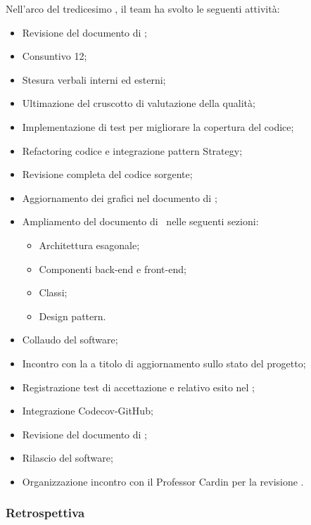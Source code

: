 Nell'arco del tredicesimo , il team ha svolto le seguenti attività:
\begin{itemize}
  \item Revisione del documento di \AdR;
  \item Consuntivo  12;
  \item Stesura verbali interni ed esterni;
  \item Ultimazione del cruscotto di valutazione della qualità;
  \item Implementazione di test  per migliorare la copertura del codice;
  \item Refactoring codice  e integrazione pattern Strategy;
  \item Revisione completa del codice sorgente;
  \item Aggiornamento dei grafici nel documento di \ST;
  \item Ampliamento del documento di \ST\ nelle seguenti sezioni:
  \begin{itemize}
    \item Architettura esagonale;
    \item Componenti back-end e front-end;
    \item Classi;
    \item Design pattern.
  \end{itemize}
  \item Collaudo del software;
  \item Incontro con la  a titolo di aggiornamento sullo stato del progetto;
  \item Registrazione test di accettazione e relativo esito nel \PdQ;
  \item Integrazione Codecov-GitHub;
  \item Revisione del documento di \ST;
  \item Rilascio del software;
  \item Organizzazione incontro con il Professor Cardin per la revisione .
\end{itemize}

\subsubsection{Retrospettiva}

